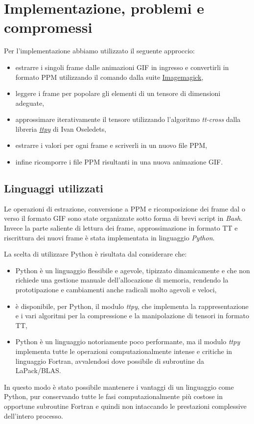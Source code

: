 \documentclass[11pt,a4paper]{article}
\begin{document}
\section{Implementazione, problemi e compromessi}
Per l'implementazione abbiamo utilizzato il seguente approccio:
\begin{itemize}
\item estrarre i singoli frame dalle animazioni GIF in ingresso e convertirli in formato PPM utilizzando il comando  dalla suite \href{http://www.imagemagick.org/}{Imagemagick},
\item leggere i frame per popolare gli elementi di un tensore di dimensioni adeguate,
\item approssimare iterativamente il tensore utilizzando l'algoritmo \emph{tt-cross} dalla libreria \href{https://github.com/oseledets/ttpy}{\emph{ttpy}} di Ivan Oseledets,
\item estrarre i valori per ogni frame e scriverli in un nuovo file PPM,
\item infine ricomporre i file PPM risultanti in una nuova animazione GIF.
\end{itemize}

\subsection{Linguaggi utilizzati}
Le operazioni di estrazione, conversione a PPM e ricomposizione dei frame dal o verso il formato GIF sono state organizzate sotto forma di brevi script in \emph{Bash}. Invece la parte saliente di lettura dei frame, approssimazione in formato TT e riscrittura dei nuovi frame è stata implementata in linguaggio \emph{Python}.

La scelta di utilizzare Python è risultata dal considerare che:
\begin{itemize}
\item Python è un linguaggio flessibile e agevole, tipizzato dinamicamente e che non richiede una gestione manuale dell'allocazione di memoria, rendendo la prototipazione e cambiamenti anche radicali molto agevoli e veloci,
\item è disponibile, per Python, il modulo \emph{ttpy}, che implementa la rappresentazione e i vari algoritmi per la compressione e la manipolazione di tensori in formato TT,
\item Python è un linguaggio notoriamente poco performante, ma il modulo \emph{ttpy} implementa tutte le operazioni computazionalmente intense e critiche in linguaggio Fortran, avvalendosi dove possibile di subroutine da LaPack/BLAS.
\end{itemize}
In questo modo è stato possibile mantenere i vantaggi di un linguaggio come Python, pur conservando tutte le fasi computazionalmente più costose in opportune subroutine Fortran e quindi non intaccando le prestazioni complessive dell'intero processo.
\end{document}
